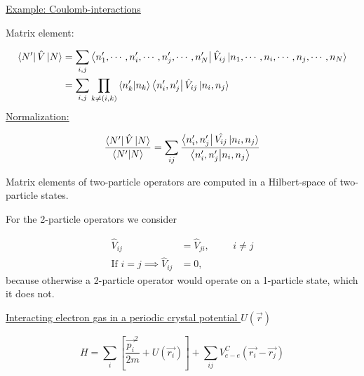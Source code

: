 \noindent \uline{Example: Coulomb-interactions}

\noindent Matrix element:

\begin{align}
	\bra{N'} \hat{V} \ket{N} &= \sum_{i,j} \bra{n'_1, \cdots , n'_i, \cdots, n'_j, \cdots, n'_N} \hat{V}_{ij} \ket{n_1, \cdots , n_i, \cdots, n_j, \cdots, n_N}\\
	&= \sum_{i,j} \prod_{k\neq (i,k)} \braket{n'_k}{n_k} \bra{n'_i, n'_j} \hat{V}_{ij} \ket{n_i, n_j}
\end{align}
\noindent \uline{Normalization:}

\begin{equation}
	\frac{\bra{N'} \hat{V} \ket{N}}{\braket{N'}{N}} = \sum_{ij} \frac{\bra{n'_i, n'_j}\hat{V_{ij}}\ket{n_i, n_j}}{\braket{n'_i,n'_j}{n_i,n_j}}
\end{equation}

\begin{tcolorbox}
	Matrix elements of two-particle operators are computed in a Hilbert-space of two-particle states.
\end{tcolorbox}

\noindent For the 2-particle operators we consider

\begin{align}
	\hat{V}_{ij} &= \hat{V}_{ji}, \hspace{1cm} i \neq j\\
	\text{If } i=j \implies \hat{V}_{ij} &=0, \nonumber 
\end{align}
because otherwise a 2-particle operator would operate on a 1-particle state, which it does not.\\
\linebreak

\noindent \uline{Interacting electron gas in a periodic crystal potential $U(\vec{r})$}



\begin{equation}
	H = \sum_i \left[\frac{\vec{p_i}^2}{2m} + U(\vec{r_i})  \right]+ \sum_{ij} V_{e-e}^C (\vec{r_i}-\vec{r_j})
\end{equation}

